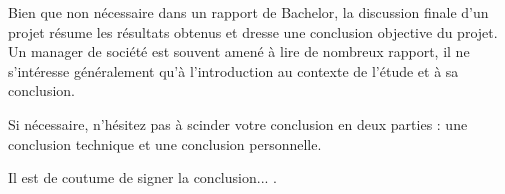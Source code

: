 Bien que non nécessaire dans un rapport de Bachelor, la discussion finale d'un projet résume les résultats obtenus et dresse une conclusion objective du projet. Un manager de société est souvent amené à lire de nombreux rapport, il ne s'intéresse généralement qu'à l'introduction au contexte de l'étude et à sa conclusion.

Si nécessaire, n'hésitez pas à scinder votre conclusion en deux parties : une conclusion technique et une conclusion personnelle.

Il est de coutume de signer la conclusion... .

\vfil
\hspace{8cm}\makeatletter\@author\makeatother\par
\hspace{8cm}\begin{minipage}{5cm}
    \printsignature
\end{minipage}